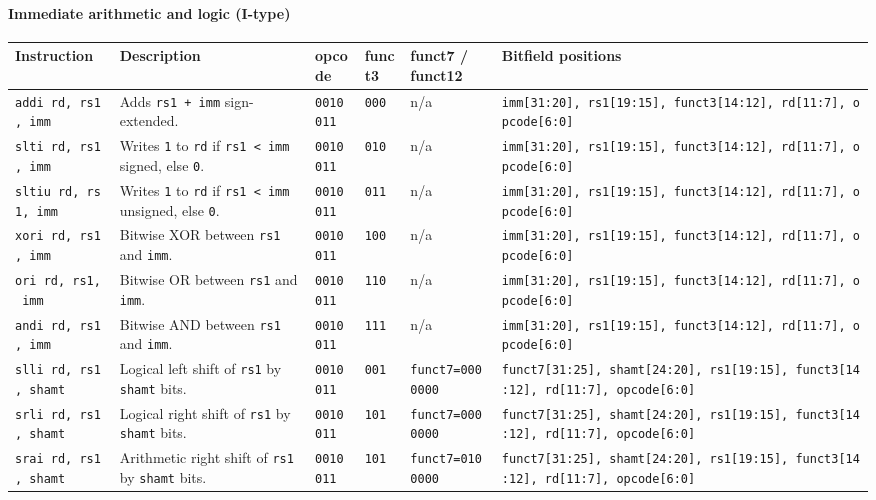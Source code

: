 \documentclass[]{article}
\let\oldparagraph\paragraph
\renewcommand{\paragraph}[1]{\oldparagraph{#1}\mbox{}}
\begin{document}
\hypertarget{immediate-arithmetic-and-logic-i-type}{%
\paragraph{Immediate arithmetic and logic
(I-type)}\label{immediate-arithmetic-and-logic-i-type}}

\begin{longtable}[]{@{}llllll@{}}
\toprule
Instruction & Description & opcode & funct3 & funct7 / funct12 &
Bitfield positions\tabularnewline
\midrule
\endhead
\texttt{addi\ rd,\ rs1,\ imm} & Adds \texttt{rs1\ +\ imm} sign-extended.
& \texttt{0010011} & \texttt{000} & n/a &
\texttt{imm{[}31:20{]},\ rs1{[}19:15{]},\ funct3{[}14:12{]},\ rd{[}11:7{]},\ opcode{[}6:0{]}}\tabularnewline
\texttt{slti\ rd,\ rs1,\ imm} & Writes \texttt{1} to \texttt{rd} if
\texttt{rs1\ \textless{}\ imm} signed, else \texttt{0}. &
\texttt{0010011} & \texttt{010} & n/a &
\texttt{imm{[}31:20{]},\ rs1{[}19:15{]},\ funct3{[}14:12{]},\ rd{[}11:7{]},\ opcode{[}6:0{]}}\tabularnewline
\texttt{sltiu\ rd,\ rs1,\ imm} & Writes \texttt{1} to \texttt{rd} if
\texttt{rs1\ \textless{}\ imm} unsigned, else \texttt{0}. &
\texttt{0010011} & \texttt{011} & n/a &
\texttt{imm{[}31:20{]},\ rs1{[}19:15{]},\ funct3{[}14:12{]},\ rd{[}11:7{]},\ opcode{[}6:0{]}}\tabularnewline
\texttt{xori\ rd,\ rs1,\ imm} & Bitwise XOR between \texttt{rs1} and
\texttt{imm}. & \texttt{0010011} & \texttt{100} & n/a &
\texttt{imm{[}31:20{]},\ rs1{[}19:15{]},\ funct3{[}14:12{]},\ rd{[}11:7{]},\ opcode{[}6:0{]}}\tabularnewline
\texttt{ori\ rd,\ rs1,\ imm} & Bitwise OR between \texttt{rs1} and
\texttt{imm}. & \texttt{0010011} & \texttt{110} & n/a &
\texttt{imm{[}31:20{]},\ rs1{[}19:15{]},\ funct3{[}14:12{]},\ rd{[}11:7{]},\ opcode{[}6:0{]}}\tabularnewline
\texttt{andi\ rd,\ rs1,\ imm} & Bitwise AND between \texttt{rs1} and
\texttt{imm}. & \texttt{0010011} & \texttt{111} & n/a &
\texttt{imm{[}31:20{]},\ rs1{[}19:15{]},\ funct3{[}14:12{]},\ rd{[}11:7{]},\ opcode{[}6:0{]}}\tabularnewline
\texttt{slli\ rd,\ rs1,\ shamt} & Logical left shift of \texttt{rs1} by
\texttt{shamt} bits. & \texttt{0010011} & \texttt{001} &
\texttt{funct7=0000000} &
\texttt{funct7{[}31:25{]},\ shamt{[}24:20{]},\ rs1{[}19:15{]},\ funct3{[}14:12{]},\ rd{[}11:7{]},\ opcode{[}6:0{]}}\tabularnewline
\texttt{srli\ rd,\ rs1,\ shamt} & Logical right shift of \texttt{rs1} by
\texttt{shamt} bits. & \texttt{0010011} & \texttt{101} &
\texttt{funct7=0000000} &
\texttt{funct7{[}31:25{]},\ shamt{[}24:20{]},\ rs1{[}19:15{]},\ funct3{[}14:12{]},\ rd{[}11:7{]},\ opcode{[}6:0{]}}\tabularnewline
\texttt{srai\ rd,\ rs1,\ shamt} & Arithmetic right shift of \texttt{rs1}
by \texttt{shamt} bits. & \texttt{0010011} & \texttt{101} &
\texttt{funct7=0100000} &
\texttt{funct7{[}31:25{]},\ shamt{[}24:20{]},\ rs1{[}19:15{]},\ funct3{[}14:12{]},\ rd{[}11:7{]},\ opcode{[}6:0{]}}\tabularnewline
\bottomrule
\end{longtable}
\end{document}
